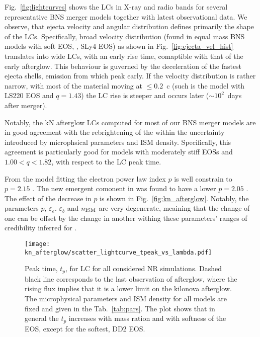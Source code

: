Fig.~\ref{fig:lightcurves} shows the \acp{LC} in X-ray and radio bands for several 
representative \ac{BNS} merger models together with latest \GRB{} observational data. 
We observe, that ejecta velocity and angular distribution defines primarily the shape of the \acp{LC}.
Specifically, broad velocity distribution (found in equal mass \ac{BNS} models 
with soft \ac{EOS}, \eg, SLy4 \ac{EOS}) as shown in Fig.~\ref{fig:ejecta_vel_hist} 
translates into wide \acp{LC}, with an early rise time, comaptible with that of the early \GRB{} afterglow. 
This behaviour is guverned by the deceleration of the fastest ejecta shells, 
emission from which peak early. If the velocity distribution is rather narrow, with most of the 
material moving at ${\leq}0.2$~c (such is the model with LS220 \ac{EOS} and $q=1.43$) 
the \ac{LC} rise is steeper and occurs later (${\sim}10^2$~days after merger). 

Notably, the \ac{kN} afterglow \acp{LC} computed for most of our \ac{BNS} merger 
models are in good agreement with the 
rebrightening of the \GRB{} within the uncertainty introduced by microphsical 
parameters and \ac{ISM} density.
Specifically, this agreement is particularly good for models with moderately stiff 
\acp{EOS} and $1.00<q<1.82$, with respect to the \ac{LC} peak time.


From the \GRB{} model fitting the electron power law index $p$ is well constrain to $p=2.15$
\citep[\eg][]{Hajela:2019mjy}. The new emergent comonent in \GRB{} was found to have a lower 
$p=2.05$ \citep{Hajela:2021faz}. The effect of the decrease in $p$ is shown in 
Fig.~\ref{fig:kn_afterglow}. Notably, the parameters $p$, $\varepsilon_e$. $\varepsilon_b$ and 
$n_{\text{ISM}}$ are very degenerate, meaining that the change of one can be offset by the change in 
another withing these parameters' ranges of credibility inferred for \GRB{}. 

\begin{figure}%
    \centering 
    \texttt{[image: kn\_afterglow/scatter\_lightcurve\_tpeak\_vs\_lambda.pdf]}
    \caption{
        Peak time, $t_p$, for \ac{LC} for all considered \ac{NR} simulations. 
        Dashed black line corresponds to the last observation of \GRB{} afterglow,
        where the rising flux implies that it is a lower limit on the kilonova 
        afterglow.
        The microphysical parameters and \ac{ISM} density for all models are fixed and 
        given in the Tab.~\ref{tab:pars}.
        The plot shows that in general the $t_p$ increases with mass ration and with 
        softness of the \ac{EOS}, except for the softest, DD2 \ac{EOS}. 
    } 
    \label{fig:lightcurve_peaks}
\end{figure}


